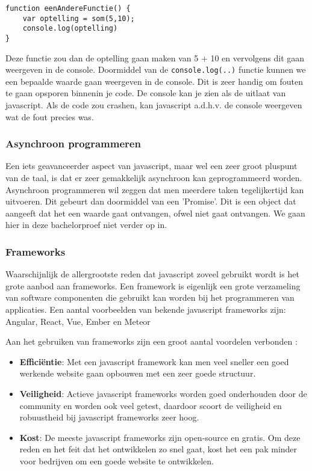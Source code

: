 \begin{lstlisting}[frame=single, caption=Een functie de som functie oproept]
function eenAndereFunctie() {
	var optelling = som(5,10);
	console.log(optelling)
}
\end{lstlisting}

Deze functie zou dan de optelling gaan maken van 5 + 10 en vervolgens dit gaan weergeven in de console. Doormiddel van de \lstinline[basicstyle=\ttfamily\color{red}]|console.log(..)| functie kunnen we een bepaalde waarde gaan weergeven in de console. Dit is zeer handig om fouten te gaan opsporen binnenin je code. De console kan je zien als de uitlaat van javascript. Als de code zou crashen, kan javascript a.d.h.v. de console weergeven wat de fout precies was.

\subsubsection{Asynchroon programmeren}
\label{sssec:asynchroon-programmeren}
Een iets geavanceerder aspect van javascript, maar wel een zeer groot pluspunt van de taal, is dat er zeer gemakkelijk asynchroon kan geprogrammeerd worden. Asynchroon programmeren wil zeggen dat men meerdere taken tegelijkertijd kan uitvoeren. Dit gebeurt dan doormiddel van een 'Promise'. Dit is een object dat aangeeft dat het een waarde gaat ontvangen, ofwel niet gaat ontvangen. We gaan hier in deze bachelorproef niet verder op in.

\subsubsection{Frameworks}
\label{sssec:frameworks}
Waarschijnlijk de allergrootste reden dat javascript zoveel gebruikt wordt is het grote aanbod aan frameworks. Een framework is eigenlijk een grote verzameling van software componenten die gebruikt kan worden bij het programmeren van applicaties. Een aantal voorbeelden van bekende javascript frameworks zijn: Angular, React, Vue, Ember en Meteor

Aan het gebruiken van frameworks zijn een groot aantal voordelen verbonden \autocite{Korotya2018}:

\begin{itemize}
	\item \textbf{Efficiëntie}: Met een javascript framework kan men veel sneller een goed werkende website gaan opbouwen met een zeer goede structuur.
	\item \textbf{Veiligheid}: Actieve javascript frameworks worden goed onderhouden door de community en worden ook veel getest, daardoor scoort de veiligheid en robuustheid bij javascript frameworks zeer hoog.
	\item \textbf{Kost}: De meeste javascript frameworks zijn open-source en gratis. Om deze reden en het feit dat het ontwikkelen zo snel gaat, kost het een pak minder voor bedrijven om een goede website te ontwikkelen.
\end{itemize}

